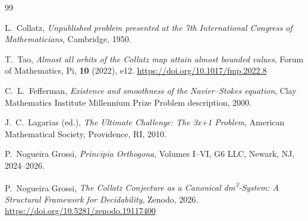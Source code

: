 \documentclass[11pt,a4paper]{article}
\begin{document}
\begin{thebibliography}{99}

L.~Collatz,
\emph{Unpublished problem presented at the 7th International Congress of
Mathematicians}, Cambridge, 1950.

T.~Tao,
\emph{Almost all orbits of the Collatz map attain almost bounded values},
Forum of Mathematics, Pi, \textbf{10} (2022), e12.
\url{https://doi.org/10.1017/fmp.2022.8}

C.~L.~Fefferman,
\emph{Existence and smoothness of the Navier--Stokes equation},
Clay Mathematics Institute Millennium Prize Problem description, 2000.

J.~C.~Lagarias (ed.),
\emph{The Ultimate Challenge: The 3x+1 Problem},
American Mathematical Society, Providence, RI, 2010.

P.~Nogueira Grossi,
\emph{Principia Orthogona}, Volumes I--VI,
G6 LLC, Newark, NJ, 2024--2026.

P.~Nogueira Grossi,
\emph{The Collatz Conjecture as a Canonical dm\textsuperscript{3}-System:
A Structural Framework for Decidability},
Zenodo, 2026.
\url{https://doi.org/10.5281/zenodo.19117400}

\end{thebibliography}
\end{document}
